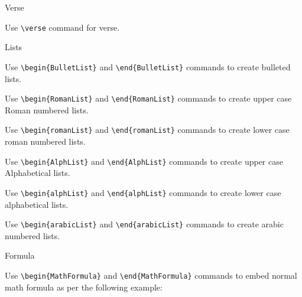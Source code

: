 \documentclass[12pt,Bold,letterpaper,TexShade]{mcgilletdclass}
\begin{document}
\begin{BulletList}
		\item{Verse}
			\begin{romanList}
			\item{Use \verb=\verse= command for verse. }
			\end{romanList}
		\item{Lists}
			\begin{romanList}
			\item{Use \verb=\begin{BulletList}= and \verb=\end{BulletList}= commands to create bulleted lists. }
			\item{Use \verb=\begin{RomanList}= and \verb=\end{RomanList}= commands to create upper case Roman numbered lists. }
			\item{Use \verb=\begin{romanList}= and \verb=\end{romanList}= commands to create lower case roman numbered lists. }
			\item{Use \verb=\begin{AlphList}= and \verb=\end{AlphList}= commands to create upper case Alphabetical lists. }
			\item{Use \verb=\begin{alphList}= and \verb=\end{alphList}= commands to create lower case alphabetical lists. }
			\item{Use \verb=\begin{arabicList}= and \verb=\end{arabicList}= commands to create arabic numbered lists. }
			\end{romanList}
		\item{Formula}
			\begin{romanList}
			\item{Use \verb=\begin{MathFormula}= and \verb=\end{MathFormula}= commands to embed normal math formula as per the following example:}
\end{romanList}
\end{BulletList}
\end{document}
